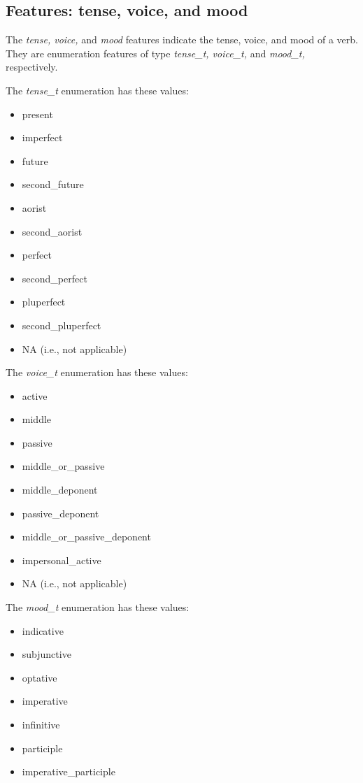 \documentclass[11pt,oneside,a4paper]{memoir}
\begin{document}
\subsection{Features: tense, voice, and mood}

The \emph{tense, voice,} and \emph{mood} features indicate the tense, voice, and
mood of a verb. They are enumeration features of type \emph{tense\_t, voice\_t,}
and \emph{mood\_t,} respectively.

The \emph{tense\_t} enumeration has these values:

\begin{itemize}
\item present
\item imperfect
\item future
\item second\_future
\item aorist
\item second\_aorist
\item perfect
\item second\_perfect
\item pluperfect
\item second\_pluperfect
\item NA (i.e., not applicable)
\end{itemize}

The \emph{voice\_t} enumeration has these values:

\begin{itemize}
\item active
\item middle
\item passive
\item middle\_or\_passive
\item middle\_deponent
\item passive\_deponent
\item middle\_or\_passive\_deponent
\item impersonal\_active
\item NA (i.e., not applicable)
\end{itemize}

The \emph{mood\_t} enumeration has these values:

\begin{itemize}
\item indicative
\item subjunctive
\item optative
\item imperative
\item infinitive
\item participle
\item imperative\_participle
\end{itemize}
\end{document}
